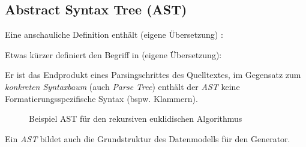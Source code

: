 \subsection{Abstract Syntax Tree (AST)}
\label{sec:ast}

Eine anschauliche Definition enthält \cite[][S. 69]{ahoCompiler} (eigene Übersetzung) :

Etwas kürzer definiert \citeauthor{gruneCompiler} den Begriff in \cite[][S. 9 ff.]{gruneCompiler} (eigene Übersetzung):

Er ist das Endprodukt eines Parsingschrittes des Quelltextes, im Gegensatz zum \emph{konkreten Syntaxbaum} (auch \emph{Parse Tree}) enthält der \emph{AST} keine Formatierungsspezifische Syntax (bspw. Klammern). 

\begin{figure}[htb]
    \centering
        \centering
    \caption{Beispiel AST für den rekursiven euklidischen Algorithmus}
    \label{fig:ast}   
\end{figure}

Ein \emph{AST} bildet auch die Grundstruktur des Datenmodells für den Generator. 


%

%
